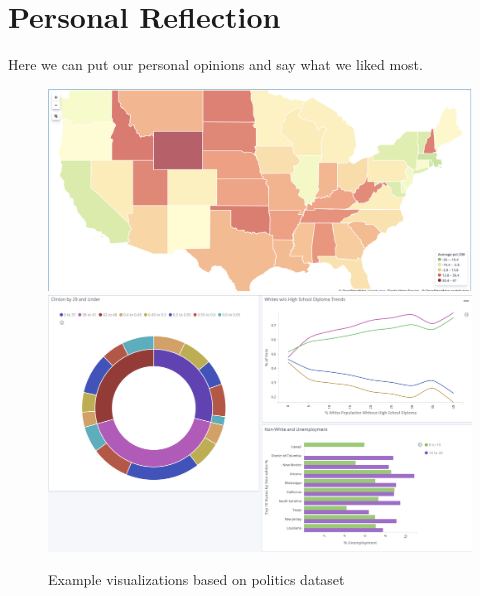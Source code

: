 \documentclass[bibliography=totoc]{article}
\begin{document}
\section{Personal Reflection}
Here we can put our personal opinions and say what we liked most.

\begin{figure}
   \includegraphics[width=\linewidth]{partisan_lean.png} 
   \includegraphics[width=\linewidth]{politics_misc.png} 
   \caption{\label{politics_examples}Example visualizations based on politics dataset}
\end{figure}
\end{document}
